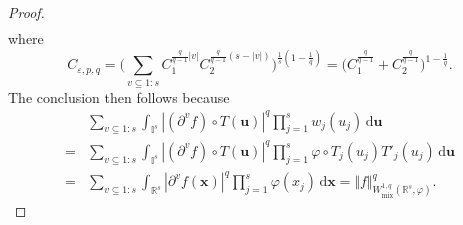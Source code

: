 \documentclass[10pt,a4paper]{amsart}
\newcommand{\bsu}{\boldsymbol{u}}
\newcommand{\bsx}{\boldsymbol{x}}
\newcommand{\itr}{\mathbb{I}}
\newcommand{\mix}{\mathrm{mix}}
\newcommand{\rd}{\,\mathrm{d}}
\newcommand{\real}{\mathbb{R}}
\begin{document}
\begin{proof}
\begin{align*}
    \end{align*}
    where
    $$C_{\varepsilon,p,q} =\Big(\sum_{v\subseteq 1{:}s} C^{\frac{q}{q-1}|v|}_1C^{\frac{q}{q-1}(s-|v|)}_2\Big)^{\frac{1}{s}(1-\frac{1}{q})}=\Big(C^{\frac{q}{q-1}}_1+C^{\frac{q}{q-1}}_2\Big)^{1-\frac{1}{q}}.$$
    The conclusion then follows because
    \begin{align*}
     &\sum_{v\subseteq 1{:}s}\int_{\itr^s}|(\partial^{v} f) \circ T(\bsu)|^q \prod_{j=1}^s w_j(u_j)\rd \bsu\\
     =&\sum_{v\subseteq 1{:}s}\int_{\itr^s}|(\partial^{v} f) \circ T(\bsu)|^q \prod_{j=1}^s \varphi\circ T_j(u_j)T'_j(u_j)\rd \bsu\\
     = &\sum_{v\subseteq 1{:}s}\int_{\real^s}|\partial^{v} f(\bsx)|^q \prod_{j=1}^s \varphi(x_j)\rd \bsx=\Vert f \Vert^q_{W^{1,q}_{\mix}(\real^s,\varphi)}.
    \end{align*}
\end{proof}
\end{document}
